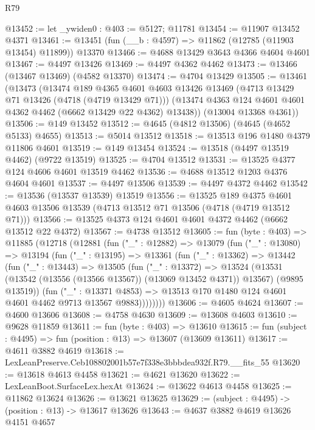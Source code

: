 \begin{lexlean}{R79}
\begin{coremodule}
@13452 := let _ywiden0 : @403 := @5127; @11781
@13454 := @11907 @13452 @4371
@13461 := @13451 (fun (__b : @4597) => @11862 (@12785 (@11903 @13454) @11899)) @13370
@13466 := @4688 @13429 @3643 @4366 @4604 @4601
@13467 := @4497 @13426
@13469 := @4497 @4362 @4462
@13473 := @13466 (@13467 @13469) (@4582 @13370)
@13474 := @4704 @13429
@13505 := @13461
    (@13473
      (@13474
        @189
        @4365
        @4601
        @4603
        @13426
        @13469
        (@4713 @13429 @71 @13426 (@4718 (@4719 @13429 @71)))
        (@13474 @4363 @124 @4601 @4601 @4362 @4462 (@6662 @13429 @22 @4362) @13438))
      (@13004 @13368 @4361))
@13506 := @149 @13452
@13512 := @4645 (@4812 @13506) (@4645 (@4652 @5133) @4655)
@13513 := @5014 @13512
@13518 := @13513 @196 @1480 @4379 @11806 @4601
@13519 := @149 @13454
@13524 := @13518 (@4497 @13519 @4462) (@9722 @13519)
@13525 := @4704 @13512
@13531 := @13525 @4377 @124 @4606 @4601 @13519 @4462
@13536 := @4688 @13512 @1203 @4376 @4604 @4601
@13537 := @4497 @13506
@13539 := @4497 @4372 @4462
@13542 := @13536 (@13537 @13539) @13519
@13556 := @13525
    @189
    @4375
    @4601
    @4603
    @13506
    @13539
    (@4713 @13512 @71 @13506 (@4718 (@4719 @13512 @71)))
@13566 := @13525 @4373 @124 @4601 @4601 @4372 @4462 (@6662 @13512 @22 @4372)
@13567 := @4738 @13512
@13605 := fun (byte : @403) =>
  @11885
    (@12718
      (@12881
        (fun ("_" : @12882) =>
        @13079
          (fun ("_" : @13080) =>
          @13194
            (fun ("_" : @13195) =>
            @13361
              (fun ("_" : @13362) =>
              @13442
                (fun ("_" : @13443) =>
                @13505
                  (fun ("_" : @13372) =>
                  @13524
                    (@13531 (@13542 (@13556 (@13566 @13567)) (@13069 @13452 @4371)) @13567)
                    (@9895 @13519))
                  (fun ("_" : @13371 @4853) =>
                  @13513 @170 @1480 @124 @4601 @4601 @4462 @9713 @13567 @9883))))))))
@13606 := @4605 @4624
@13607 := @4600 @13606
@13608 := @4758 @4630
@13609 := @13608 @4603
@13610 := @9628 @11859
@13611 := fun (byte : @403) => @13610
@13615 := fun (subject : @4495) => fun (position : @13) => @13607 (@13609 @13611)
@13617 := @4611 @3882 @4619
@13618 := LexLeanPreserve.Ceb108802001b57e7f338e3bbbdea932f.R79.__fits_55
@13620 := @13618 @4613 @4458
@13621 := @4621 @13620
@13622 := LexLeanBoot.SurfaceLex.hexAt
@13624 := @13622 @4613 @4458
@13625 := @11862 @13624
@13626 := @13621 @13625
@13629 := (subject : @4495) -> (position : @13) -> @13617 @13626
@13643 := @4637
    @3882
    @4619
    @13626
    @4151
    @4657

\end{coremodule}
\end{lexlean}
